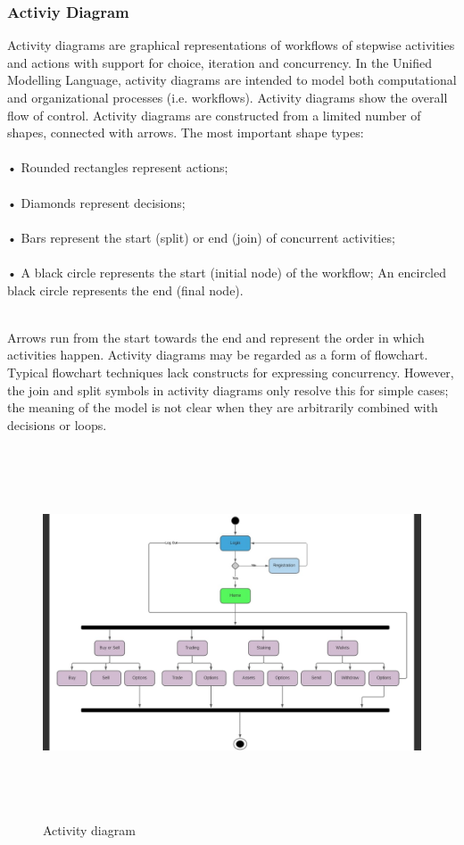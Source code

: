 \documentclass[12pt]{article}
\begin{document}
\subsubsection{Activiy Diagram}


Activity diagrams are graphical representations of workflows of stepwise
activities and actions with support for choice, iteration and concurrency. In the
Unified Modelling Language, activity diagrams are intended to model both
computational and organizational processes (i.e. workflows). Activity diagrams
show the overall flow of control. Activity diagrams are constructed from a limited
number of shapes, connected with arrows. The most important shape types:
\\
\\
• Rounded rectangles represent actions;\\
\\
• Diamonds represent decisions;\\
\\
• Bars represent the start (split) or end (join) of concurrent activities;\\
\\
• A black circle represents the start (initial node) of the workflow; An encircled
black circle represents the end (final node).\\
\\
\par Arrows run from the start towards the end and represent the order in
which activities happen. Activity diagrams may be regarded as a form of
flowchart. Typical flowchart techniques lack constructs for expressing concurrency.
However, the join and split symbols in activity diagrams only resolve this
for simple cases; the meaning of the model is not clear when they are arbitrarily
combined with decisions or loops.

\newpage
\vspace*{10px}
\begin{figure}[h!]
\begin{center}
\includegraphics[width=17cm, height=11cm]{ACT}
\caption{Activity diagram }
\end{center}
\end{figure}
\end{document}
